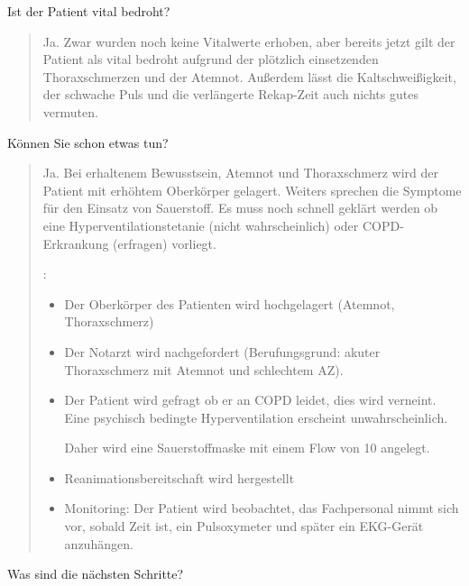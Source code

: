 \documentclass[
ngerman,
paper=a4,
asymmetric,
fontsize=10pt,
headings=small,
draft=false,
numbers=noenddot,
bibtotocnumbered,
footnotes=multiple,
]{scrreprt}
\begin{document}
\noindent Ist der Patient vital bedroht?
\begin{quote}
  Ja. Zwar wurden
  noch keine Vitalwerte erhoben, aber bereits jetzt gilt der
  Patient als vital bedroht aufgrund der plötzlich
  einsetzenden Thoraxschmerzen und der Atemnot. Außerdem
  lässt die Kaltschweißigkeit, der schwache Puls und die
  verlängerte Rekap-Zeit auch nichts gutes vermuten.
\end{quote}

\noindent Können Sie schon etwas tun?

\begin{quote}
  \marginlabel{\TxMassVit}Ja.  Bei erhaltenem Bewusstsein, Atemnot und
  Thoraxschmerz wird der Patient mit erhöhtem Oberkörper gelagert. Weiters sprechen
  die Symptome für den Einsatz von Sauerstoff. Es muss noch schnell geklärt werden
  ob eine Hyperventilationstetanie (nicht wahrscheinlich) oder COPD-Erkrankung
  (erfragen) vorliegt.
  
  \TxMassVit:
  
  \begin{itemize}
    \item Der Oberkörper des Patienten wird hochgelagert (Atemnot,
    Thoraxschmerz)
    \item Der Notarzt wird nachgefordert (Berufungsgrund: akuter
    Thoraxschmerz mit Atemnot und schlechtem AZ).
    \item Der Patient wird gefragt ob er an COPD leidet, dies wird verneint.
    Eine psychisch bedingte Hyperventilation erscheint unwahrscheinlich.
    
    Daher wird eine Sauerstoffmaske mit einem Flow von
    10{\LPerMin*} angelegt.
    \item Reanimationsbereitschaft wird hergestellt
    \item Monitoring: Der Patient wird beobachtet, das
    Fachpersonal nimmt sich vor, sobald Zeit ist, ein
    Pulsoxymeter und später ein EKG-Gerät anzuhängen.
  \end{itemize}
  
\end{quote}


\noindent Was sind die nächsten Schritte?
\end{document}
